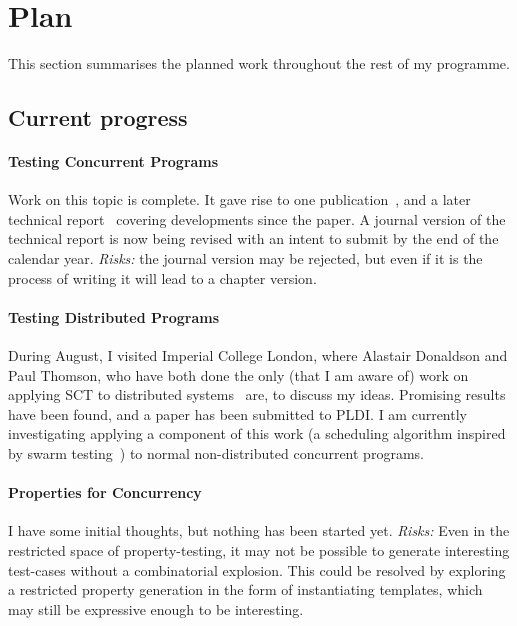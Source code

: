 \documentclass{article}
\begin{document}
\section{Plan}
\label{sec:plan}

This section summarises the planned work throughout the rest of my
programme.

\subsection{Current progress}

\paragraph{Testing Concurrent Programs} Work on this topic is
complete. It gave rise to one publication~\cite{walker2015}, and a
later technical report~\cite{YCS-2016-503} covering developments since
the paper. A journal version of the technical report is now being
revised with an intent to submit by the end of the calendar
year. \emph{Risks:} the journal version may be rejected, but even if
it is the process of writing it will lead to a chapter version.

\paragraph{Testing Distributed Programs} During August, I visited
Imperial College London, where Alastair Donaldson and Paul Thomson,
who have both done the only (that I am aware of) work on applying SCT
to distributed systems~\cite{deligiannis2015,deligiannis2016} are, to
discuss my ideas. Promising results have been found, and a paper has
been submitted to PLDI. I am currently investigating applying a
component of this work (a scheduling algorithm inspired by swarm
testing~\cite{groce2012}) to normal non-distributed concurrent
programs.

\paragraph{Properties for Concurrency} I have some initial thoughts,
but nothing has been started yet. \emph{Risks:} Even in the restricted
space of property-testing, it may not be possible to generate
interesting test-cases without a combinatorial explosion. This could
be resolved by exploring a restricted property generation in the form
of instantiating templates, which may still be expressive enough to be
interesting.
\end{document}
